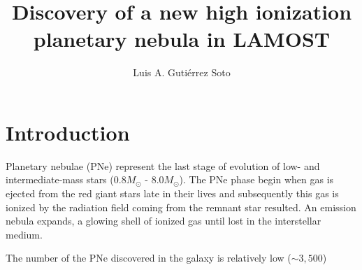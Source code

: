 \documentclass{article}
\title{Discovery of a new high  ionization planetary nebula in LAMOST}
\author{Luis A. Gutiérrez Soto     
}
\newcommand\msol{M_\odot}
\begin{document}
\maketitle

\section{Introduction}
\label{sec:intro}

Planetary nebulae (PNe) represent the last stage of evolution of low- and intermediate-mass stars (0.8$\msol$ - 8.0$\msol$). The PNe phase begin when gas is ejected from the red giant stars late in their lives and subsequently this gas is ionized by the radiation field coming from the remnant star resulted. An emission nebula expands, a glowing shell of ionized gas until lost in the interstellar medium. 

The number of the PNe discovered in the galaxy is relatively low (\(\sim 3,500\))


\end{document}
